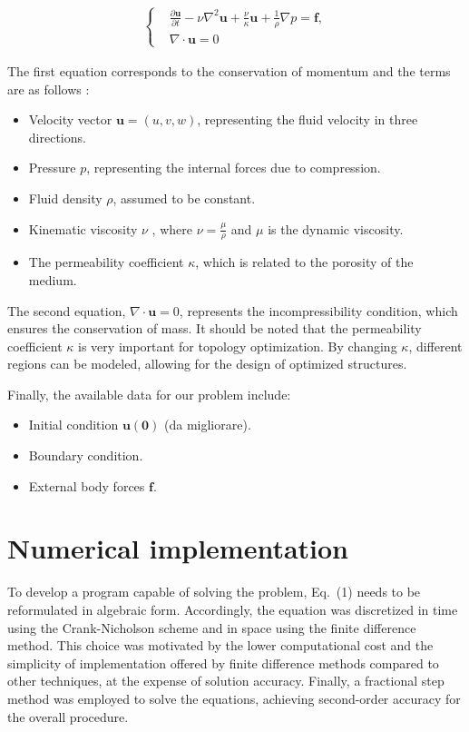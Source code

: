 \documentclass[12pt]{article}
\begin{document}
\begin{align}
\left\{
\begin{aligned}
    &\frac{\partial \mathbf{u}}{\partial t}
    - \nu \nabla^2 \mathbf{u}
    + \frac{\nu}{\kappa} \mathbf{u}
    + \frac{1}{\rho} \nabla p = \mathbf{f}, \\
    &\nabla \cdot \mathbf{u} = 0
\end{aligned}
\right.
\end{align}


The first equation corresponds to the conservation of momentum and 
the terms are as follows : 

\begin{itemize}
    \item Velocity vector $\mathbf{u} = (u,v,w)$, representing the fluid velocity in three directions.
    \item Pressure $p$, representing the internal forces due to compression.
    \item Fluid density $\rho$, assumed to be constant. 
    \item Kinematic viscosity $\nu$ , where $\nu = \frac{\mu}{\rho}$ and $\mu$ is the dynamic viscosity. 
    \item The permeability coefficient $\kappa$, which is related to the porosity of the medium.
\end{itemize}

The second equation, $\nabla \cdot \mathbf{u} = 0$, represents the incompressibility condition, which ensures the conservation of mass.
It should be noted that the permeability coefficient $\kappa$ is very important for topology optimization. 
By changing $\kappa$, different regions can be modeled, allowing for the design of optimized structures.

Finally, the available data for our problem include:
\begin{itemize}
    \item Initial condition $\mathbf{u(0)}$ (da migliorare). 
    \item Boundary condition. 
    \item External body forces $\mathbf{f}$.
\end{itemize}


\section{Numerical implementation}

To develop a program capable of solving the problem, Eq.~(1) needs to be reformulated in algebraic form. 
Accordingly, the equation was discretized in time using the Crank-Nicholson scheme and in space using the finite difference method.
This choice was motivated by the lower computational cost and the simplicity of implementation offered by finite difference methods compared to other techniques, at the expense of solution accuracy. 
Finally, a fractional step method was employed to solve the equations, achieving second-order accuracy for the overall procedure.
\end{document}
